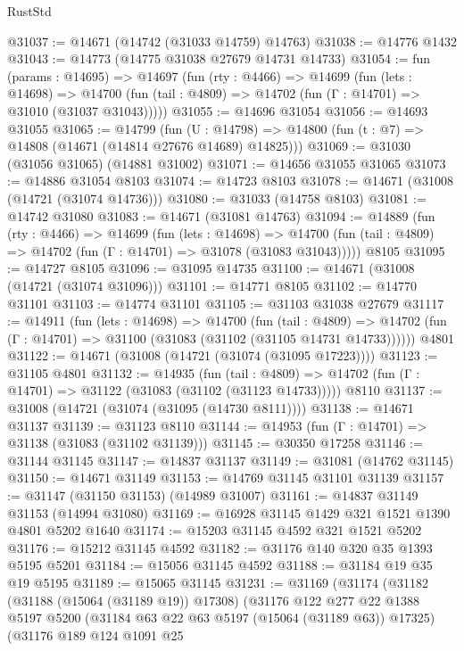 \begin{lexlean}{RustStd}
\begin{coremodule}
@31037 := @14671 (@14742 (@31033 @14759) @14763)
@31038 := @14776 @1432
@31043 := @14773 (@14775 @31038 @27679 @14731 @14733)
@31054 := fun (params : @14695) =>
  @14697
    (fun (rty : @4466) =>
    @14699
      (fun (lets : @14698) =>
      @14700 (fun (tail : @4809) => @14702 (fun (Γ : @14701) => @31010 (@31037 @31043)))))
@31055 := @14696 @31054
@31056 := @14693 @31055
@31065 := @14799
    (fun (U : @14798) => @14800 (fun (t : @7) => @14808 (@14671 (@14814 @27676 @14689) @14825)))
@31069 := @31030 (@31056 @31065) (@14881 @31002)
@31071 := @14656 @31055 @31065
@31073 := @14886 @31054 @8103
@31074 := @14723 @8103
@31078 := @14671 (@31008 (@14721 (@31074 @14736)))
@31080 := @31033 (@14758 @8103)
@31081 := @14742 @31080
@31083 := @14671 (@31081 @14763)
@31094 := @14889
    (fun (rty : @4466) =>
    @14699
      (fun (lets : @14698) =>
      @14700 (fun (tail : @4809) => @14702 (fun (Γ : @14701) => @31078 (@31083 @31043)))))
    @8105
@31095 := @14727 @8105
@31096 := @31095 @14735
@31100 := @14671 (@31008 (@14721 (@31074 @31096)))
@31101 := @14771 @8105
@31102 := @14770 @31101
@31103 := @14774 @31101
@31105 := @31103 @31038 @27679
@31117 := @14911
    (fun (lets : @14698) =>
    @14700
      (fun (tail : @4809) =>
      @14702 (fun (Γ : @14701) => @31100 (@31083 (@31102 (@31105 @14731 @14733))))))
    @4801
@31122 := @14671 (@31008 (@14721 (@31074 (@31095 @17223))))
@31123 := @31105 @4801
@31132 := @14935
    (fun (tail : @4809) => @14702 (fun (Γ : @14701) => @31122 (@31083 (@31102 (@31123 @14733)))))
    @8110
@31137 := @31008 (@14721 (@31074 (@31095 (@14730 @8111))))
@31138 := @14671 @31137
@31139 := @31123 @8110
@31144 := @14953 (fun (Γ : @14701) => @31138 (@31083 (@31102 @31139)))
@31145 := @30350 @17258
@31146 := @31144 @31145
@31147 := @14837 @31137
@31149 := @31081 (@14762 @31145)
@31150 := @14671 @31149
@31153 := @14769 @31145 @31101 @31139
@31157 := @31147 (@31150 @31153) (@14989 @31007)
@31161 := @14837 @31149 @31153 (@14994 @31080)
@31169 := @16928 @31145 @1429 @321 @1521 @1390 @4801 @5202 @1640
@31174 := @15203 @31145 @4592 @321 @1521 @5202
@31176 := @15212 @31145 @4592
@31182 := @31176 @140 @320 @35 @1393 @5195 @5201
@31184 := @15056 @31145 @4592
@31188 := @31184 @19 @35 @19 @5195
@31189 := @15065 @31145
@31231 := @31169
    (@31174
      (@31182
        (@31188 (@15064 (@31189 @19)) @17308)
        (@31176
          @122
          @277
          @22
          @1388
          @5197
          @5200
          (@31184 @63 @22 @63 @5197 (@15064 (@31189 @63)) @17325)
          (@31176
            @189
            @124
            @1091
            @25

\end{coremodule}
\end{lexlean}
